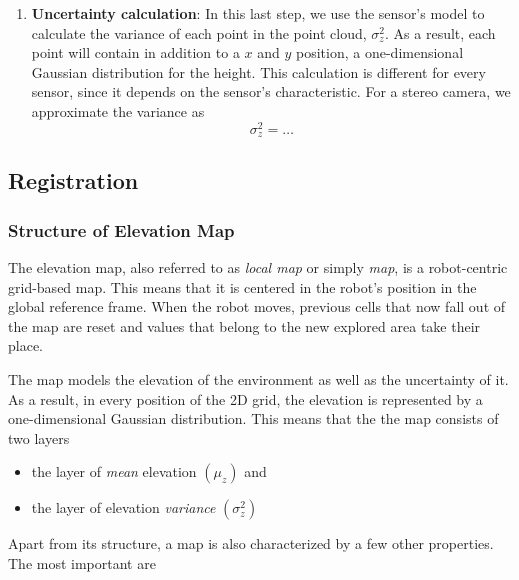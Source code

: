 \begin{enumerate}
    \item \textbf{Uncertainty calculation}:
        In this last step, we use the sensor's model to calculate the variance
        of each point in the point cloud, $\sigma^2_z$.
        As a result, each point will contain in addition to a $x$ and $y$
        position, a one-dimensional Gaussian distribution for the height.
        This calculation is different for every sensor, since it depends
        on the sensor's characteristic.
        For a stereo camera, we approximate the variance as
        \begin{equation}
            \sigma^2_z = \dots
        \end{equation}
\end{enumerate}


\subsection{Registration}

\subsubsection{Structure of Elevation Map} \label{map_structure}

The elevation map, also referred to as \textit{local map} or simply
\textit{map}, is a robot-centric grid-based map.
This means that it is centered in the robot's position in the
global reference frame.
When the robot moves, previous cells that now fall out of the map are
reset and values that belong to the new explored area take their place.

The map models the elevation of the environment as well as the uncertainty
of it.
As a result, in every position of the 2D grid, the elevation is
represented by a one-dimensional Gaussian distribution.
This means that the the map consists of two layers

\begin{itemize}
    \item the layer of \textit{mean} elevation $(\mu_z)$ and
    \item the layer of elevation \textit{variance} $(\sigma^2_z)$
\end{itemize}

Apart from its structure, a map is also characterized by a few other
properties.
The most important are

